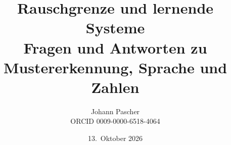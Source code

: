 \documentclass[11pt,a4paper]{report}
\title{Rauschgrenze und lernende Systeme\\[0.5em]
  \large Fragen und Antworten zu Mustererkennung, Sprache und Zahlen}
\date{13.~Oktober 2026}
\author{Johann Pascher\\\small ORCID 0009-0000-6518-4064}
\begin{document}
\renewcommand{\thechapter}{}
\renewcommand{\thesection}{\arabic{section}}
\maketitle
\tableofcontents

\end{document}
